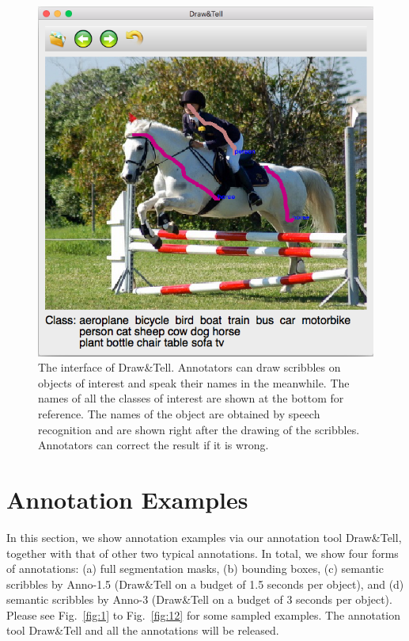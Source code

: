 \documentclass[11pt,twocolumn,letterpaper]{article}
\begin{document}
\begin{figure}
\centering
\includegraphics[width=0.7\linewidth]{figSM/draw_tell_interface.png} 
\caption{The interface of Draw\&Tell.  Annotators can draw scribbles on objects of interest and speak their names in the meanwhile. The names of all the classes of interest are shown at the bottom for reference. The names of the object are obtained by speech recognition and are shown right after the drawing of the scribbles. Annotators can correct the result if it is wrong.}
\label{fig:0}
\end{figure}


\section{Annotation Examples}
In this section, we show annotation examples via our annotation tool Draw\&Tell, together with that of other two typical annotations.
In total, we show four forms of annotations: 
(a) full segmentation masks, (b) bounding boxes, (c) semantic scribbles by Anno-1.5 (Draw\&Tell on a budget of 1.5 seconds per object), and (d) semantic scribbles by Anno-3 (Draw\&Tell on a budget of 3 seconds per object).  Please see Fig.~\ref{fig:1} to Fig.~\ref{fig:12} for some sampled examples. The annotation tool Draw\&Tell and all the annotations will be released. 
\end{document}

